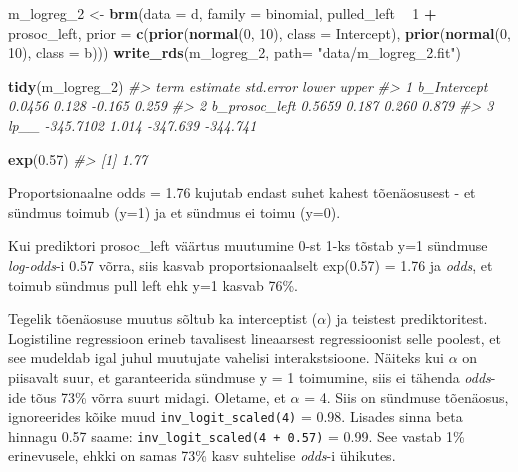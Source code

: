 \documentclass[]{book}
\newenvironment{Shaded}{\begin{snugshade}}{\end{snugshade}}
\newcommand{\KeywordTok}[1]{\textcolor[rgb]{0.13,0.29,0.53}{\textbf{#1}}}
\newcommand{\DataTypeTok}[1]{\textcolor[rgb]{0.13,0.29,0.53}{#1}}
\newcommand{\DecValTok}[1]{\textcolor[rgb]{0.00,0.00,0.81}{#1}}
\newcommand{\FloatTok}[1]{\textcolor[rgb]{0.00,0.00,0.81}{#1}}
\newcommand{\StringTok}[1]{\textcolor[rgb]{0.31,0.60,0.02}{#1}}
\newcommand{\CommentTok}[1]{\textcolor[rgb]{0.56,0.35,0.01}{\textit{#1}}}
\newcommand{\OperatorTok}[1]{\textcolor[rgb]{0.81,0.36,0.00}{\textbf{#1}}}
\newcommand{\NormalTok}[1]{#1}
\begin{document}
\begin{Shaded}
\begin{Highlighting}[]
\NormalTok{m_logreg_}\DecValTok{2}\NormalTok{ <-}
\StringTok{  }\KeywordTok{brm}\NormalTok{(}\DataTypeTok{data =}\NormalTok{ d, }\DataTypeTok{family =}\NormalTok{ binomial,}
\NormalTok{      pulled_left }\OperatorTok{~}\StringTok{ }\DecValTok{1} \OperatorTok{+}\StringTok{ }\NormalTok{prosoc_left,}
      \DataTypeTok{prior =} \KeywordTok{c}\NormalTok{(}\KeywordTok{prior}\NormalTok{(}\KeywordTok{normal}\NormalTok{(}\DecValTok{0}\NormalTok{, }\DecValTok{10}\NormalTok{), }\DataTypeTok{class =}\NormalTok{ Intercept),}
                \KeywordTok{prior}\NormalTok{(}\KeywordTok{normal}\NormalTok{(}\DecValTok{0}\NormalTok{, }\DecValTok{10}\NormalTok{), }\DataTypeTok{class =}\NormalTok{ b)))}
\KeywordTok{write_rds}\NormalTok{(m_logreg_}\DecValTok{2}\NormalTok{, }\DataTypeTok{path=} \StringTok{"data/m_logreg_2.fit"}\NormalTok{)}
\end{Highlighting}
\end{Shaded}

\begin{Shaded}
\begin{Highlighting}[]
\KeywordTok{tidy}\NormalTok{(m_logreg_}\DecValTok{2}\NormalTok{)}
\CommentTok{#>            term  estimate std.error    lower    upper}
\CommentTok{#> 1   b_Intercept    0.0456     0.128   -0.165    0.259}
\CommentTok{#> 2 b_prosoc_left    0.5659     0.187    0.260    0.879}
\CommentTok{#> 3          lp__ -345.7102     1.014 -347.639 -344.741}
\end{Highlighting}
\end{Shaded}

\begin{Shaded}
\begin{Highlighting}[]
\KeywordTok{exp}\NormalTok{(}\FloatTok{0.57}\NormalTok{)}
\CommentTok{#> [1] 1.77}
\end{Highlighting}
\end{Shaded}

Proportsionaalne odds = 1.76 kujutab endast suhet kahest tõenäosusest -
et sündmus toimub (y=1) ja et sündmus ei toimu (y=0).

Kui prediktori prosoc\_left väärtus muutumine 0-st 1-ks tõstab y=1
sündmuse \emph{log-odds}-i 0.57 võrra, siis kasvab proportsionaalselt
exp(0.57) = 1.76 ja \emph{odds}, et toimub sündmus pull left ehk y=1
kasvab 76\%.

Tegelik tõenäosuse muutus sõltub ka interceptist (\(\alpha\)) ja
teistest prediktoritest. Logistiline regressioon erineb tavalisest
lineaarsest regressioonist selle poolest, et see mudeldab igal juhul
muutujate vahelisi interakstsioone. Näiteks kui \(\alpha\) on piisavalt
suur, et garanteerida sündmuse y = 1 toimumine, siis ei tähenda
\emph{odds}-ide tõus 73\% võrra suurt midagi. Oletame, et \(\alpha\) =
4. Siis on sündmuse tõenäosus, ignoreerides kõike muud
\texttt{inv\_logit\_scaled(4)} = 0.98. Lisades sinna beta hinnagu 0.57
saame: \texttt{inv\_logit\_scaled(4\ +\ 0.57)} = 0.99. See vastab 1\%
erinevusele, ehkki on samas 73\% kasv suhtelise \emph{odds}-i ühikutes.
\end{document}
